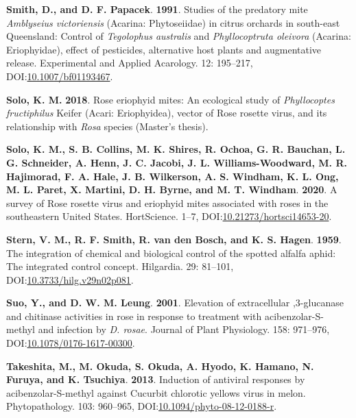 \documentclass[12pt,final,CPage]{ufthesis}
\newlength{\cslhangindent}
\newenvironment{CSLReferences}[2] %
{%
	\setlength{\parindent}{0pt}
	\ifodd #1 \everypar{\setlength{\hangindent}{\cslhangindent}}\ignorespaces\fi
	\ifnum #2 > 0
	\setlength{\parskip}{#2\baselineskip}
	\fi
}%
{}
\begin{document}
{\begin{CSLReferences}{1}{0}
  \leavevmode{}%
  \textbf{Smith, D., and D. F. Papacek}. \textbf{1991}. Studies of the predatory mite {\emph{Amblyseius victoriensis}} ({{Acarina}: {Phytoseiidae}}) in citrus orchards in south-east {Queensland}: Control of {\emph{Tegolophus australis}} and {\emph{Phyllocoptruta oleivora}} ({{Acarina}: {Eriophyidae}}), effect of pesticides, alternative host plants and augmentative release. Experimental and Applied Acarology. 12: 195--217, DOI:\href{https://doi.org/10.1007/bf01193467}{10.1007/bf01193467}.

  \leavevmode{}%
  \textbf{Solo, K. M.} \textbf{2018}. Rose eriophyid mites: An ecological study of {\emph{Phyllocoptes fructiphilus}} {Keifer} {({Acari}: {Eriophyidea})}, vector of {Rose rosette virus}, and its relationship with {\emph{Rosa}} species (Master's thesis).

  \leavevmode{}%
  \textbf{Solo, K. M., S. B. Collins, M. K. Shires, R. Ochoa, G. R. Bauchan, L. G. Schneider, A. Henn, J. C. Jacobi, J. L. Williams-Woodward, M. R. Hajimorad, F. A. Hale, J. B. Wilkerson, A. S. Windham, K. L. Ong, M. L. Paret, X. Martini, D. H. Byrne, and M. T. Windham}. \textbf{2020}. A survey of {Rose rosette virus} and eriophyid mites associated with roses in the southeastern {United States}. {HortScience}. 1--7, DOI:\href{https://doi.org/10.21273/hortsci14653-20}{10.21273/hortsci14653-20}.

  \leavevmode{}%
  \textbf{Stern, V. M., R. F. Smith, R. van den Bosch, and K. S. Hagen}. \textbf{1959}. The integration of chemical and biological control of the spotted alfalfa aphid: The integrated control concept. Hilgardia. 29: 81--101, DOI:\href{https://doi.org/10.3733/hilg.v29n02p081}{10.3733/hilg.v29n02p081}.

  \leavevmode{}%
  \textbf{Suo, Y., and D. W. M. Leung}. \textbf{2001}. Elevation of extracellular ,3-glucanase and chitinase activities in rose in response to treatment with acibenzolar-{S}-methyl and infection by {\emph{D. rosae}}. Journal of Plant Physiology. 158: 971--976, DOI:\href{https://doi.org/10.1078/0176-1617-00300}{10.1078/0176-1617-00300}.

  \leavevmode{}%
  \textbf{Takeshita, M., M. Okuda, S. Okuda, A. Hyodo, K. Hamano, N. Furuya, and K. Tsuchiya}. \textbf{2013}. Induction of antiviral responses by acibenzolar-{S}-methyl against {Cucurbit chlorotic yellows virus} in melon. Phytopathology{\textregistered}. 103: 960--965, DOI:\href{https://doi.org/10.1094/phyto-08-12-0188-r}{10.1094/phyto-08-12-0188-r}.


\end{CSLReferences}}
\end{document}
